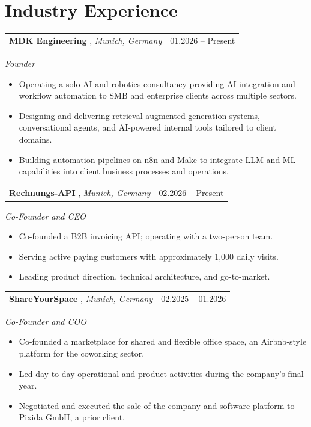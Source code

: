 \documentclass[11pt,a4paper]{article}
\makeatletter
\newcommand{\cventry}[3]{%
    \begin{tabularx}{\textwidth}{@{}Xr@{}}
        \textbf{#1}, \textit{#2} & #3 \\
    \end{tabularx}%
    \vspace{-0.35em}\par%
}
\makeatother
\begin{document}
\section*{Industry Experience}

\cventry{MDK Engineering \normalfont{\small(\href{https://www.marcelkueck.dev/}{marcelkueck.dev})}}{Munich, Germany}{01.2026 -- Present}
\textit{Founder}
\begin{itemize}
    \item Operating a solo AI and robotics consultancy providing AI integration and workflow automation to SMB and enterprise clients across multiple sectors.
    \item Designing and delivering retrieval-augmented generation systems, conversational agents, and AI-powered internal tools tailored to client domains.
    \item Building automation pipelines on n8n and Make to integrate LLM and ML capabilities into client business processes and operations.
\end{itemize}

\vspace{0.25em}
\cventry{Rechnungs-API \normalfont{\small(\href{https://www.rechnungs-api.de}{rechnungs-api.de})}}{Munich, Germany}{02.2026 -- Present}
\textit{Co-Founder and CEO}
\begin{itemize}
    \item Co-founded a B2B invoicing API; operating with a two-person team.
    \item Serving active paying customers with approximately 1{,}000 daily visits.
    \item Leading product direction, technical architecture, and go-to-market.
\end{itemize}

\vspace{0.25em}
\cventry{ShareYourSpace \normalfont{\small(\href{https://www.shareyourspace.com}{shareyourspace.com})}}{Munich, Germany}{02.2025 -- 01.2026}
\textit{Co-Founder and COO}
\begin{itemize}
    \item Co-founded a marketplace for shared and flexible office space, an Airbnb-style platform for the coworking sector.
    \item Led day-to-day operational and product activities during the company's final year.
    \item Negotiated and executed the sale of the company and software platform to Pixida GmbH, a prior client.
\end{itemize}
\end{document}
